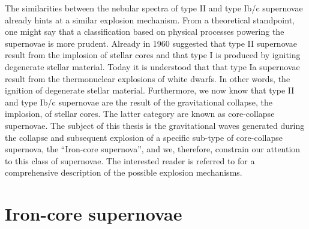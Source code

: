 The similarities between the nebular spectra of type II and type Ib/c supernovae already hints at a similar explosion mechanism. From a theoretical standpoint, one might say that a classification based on physical processes
powering the supernovae is more prudent. Already in 1960 \cite{hoyle_60} suggested that type II supernovae result from
the implosion of stellar cores and that type I is produced by igniting degenerate stellar material. Today it is understood that
that type Ia supernovae result from the thermonuclear explosions of white dwarfs. In other words, the ignition of degenerate stellar material.
Furthermore, we now know that type II and type Ib/c supernovae are the result of the gravitational collapse, the implosion, of stellar cores.
The latter category are known as core-collapse supernovae. The subject of this thesis is the gravitational waves generated during the collapse and subsequent explosion of a specific sub-type of core-collapse supernova, the ``Iron-core supernova'', and we, therefore, 
constrain our attention to this class of supernovae. The interested reader is referred to \cite{janka_12} for a comprehensive description of the possible explosion mechanisms.

\section{Iron-core supernovae}
